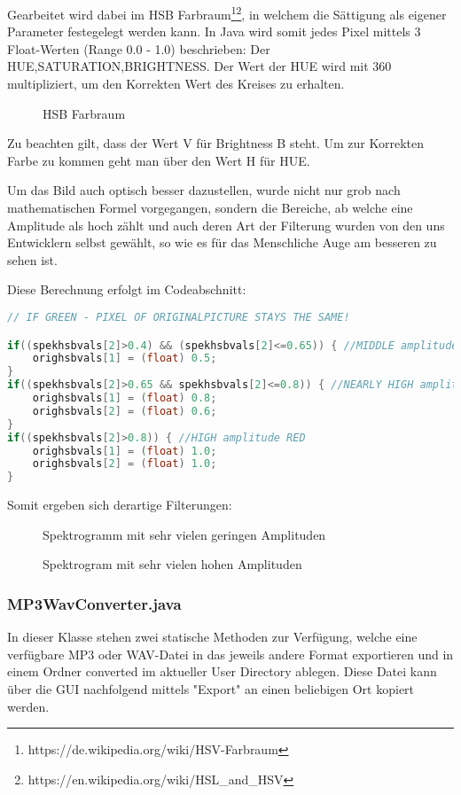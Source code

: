 \documentclass[12pt,a4paper]{article}
\begin{document}
Gearbeitet wird dabei im HSB Farbraum\footnote{https://de.wikipedia.org/wiki/HSV-Farbraum}\footnote{https://en.wikipedia.org/wiki/HSL\_and\_HSV}, in welchem die Sättigung als eigener Parameter festegelegt werden kann. In Java wird somit jedes Pixel mittels 3 Float-Werten (Range 0.0 - 1.0) beschrieben: Der HUE,SATURATION,BRIGHTNESS. Der Wert der HUE wird mit 360 multipliziert, um den Korrekten Wert des Kreises zu erhalten.
\begin{figure} [h]%
	\centering
	\label{fig:hsb} 
	\caption{HSB Farbraum}
\end{figure}
Zu beachten gilt, dass der Wert V für Brightness B steht.
Um zur Korrekten Farbe zu kommen geht man über den Wert H für HUE.

Um das Bild auch optisch besser dazustellen, wurde nicht nur grob nach mathematischen Formel vorgegangen, sondern die Bereiche, ab welche eine Amplitude als hoch zählt und auch deren Art der Filterung wurden von den uns Entwicklern selbst gewählt, so wie es für das Menschliche Auge am besseren zu sehen ist.\newpage

Diese Berechnung erfolgt im Codeabschnitt:
\begin{lstlisting}[language=JAVA]
// IF GREEN - PIXEL OF ORIGINALPICTURE STAYS THE SAME!

if((spekhsbvals[2]>0.4) && (spekhsbvals[2]<=0.65)) { //MIDDLE amplitude YELLOW
	orighsbvals[1] = (float) 0.5;
}
if((spekhsbvals[2]>0.65 && spekhsbvals[2]<=0.8)) { //NEARLY HIGH amplitude ORANGE
	orighsbvals[1] = (float) 0.8;
	orighsbvals[2] = (float) 0.6;
}
if((spekhsbvals[2]>0.8)) { //HIGH amplitude RED
	orighsbvals[1] = (float) 1.0;
	orighsbvals[2] = (float) 1.0;
}
\end{lstlisting}

Somit ergeben sich derartige Filterungen:
\begin{figure} [h]%
	\centering
	\label{fig:filteredImage} 
	\caption{Spektrogramm mit sehr vielen geringen Amplituden}
\end{figure}

\begin{figure} [h]%
	\centering
	\label{fig:filteredImage1} 
	\caption{Spektrogram mit sehr vielen hohen Amplituden}
\end{figure}
\subsubsection{MP3WavConverter.java}
In dieser Klasse stehen zwei statische Methoden zur Verfügung, welche eine verfügbare MP3 oder WAV-Datei in das jeweils andere Format exportieren und in einem Ordner converted im aktueller User Directory ablegen. Diese Datei kann über die GUI nachfolgend mittels "Export" an einen beliebigen Ort kopiert werden.
\end{document}
